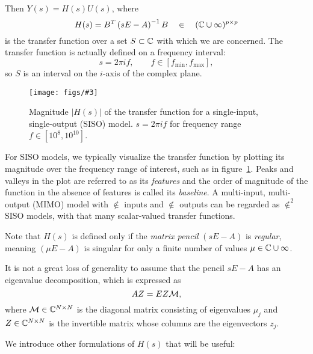 \documentclass[letterpaper]{article}
\newcommand{\putfig}[3][{560 420}]{\texttt{[image: figs/\#3]}} %
\theoremstyle{remark}
\begin{document}
\begin{description}
	Then $Y(s)=H(s)U(s)$, where 
	\begin{equation}
		H(s) = B^T\left(sE-A\right)^{-1}B \quad \in \quad(\mathbb{C}\cup\infty)^{p\times p}
		\label{eq:tfunc}
	\end{equation}
	is the transfer function over a set $S\subset\mathbb{C}$ with which we are concerned.
    The transfer function is actually defined on a frequency interval:
    \begin{equation}
    s = 2\pi i f,\qquad f\in\left[f_\mathrm{min},f_\mathrm{max}\right], 
    \label{eq:tfunc_domain}
    \end{equation}
    so $S$ is an interval on the $i$-axis of the complex plane.  
    
    \begin{figure}[htbp]
		\centering
		\putfig{.48}{ex1b_tfunc.png} 			
		\caption{Magnitude $\vert H(s) \vert$ of the transfer function for a 
		single-input, single-output (SISO) model.  $s=2\pi i f$ for frequency range
		$f\in \left[10^8,10^{10}\right]$.}
		\label{fig:ex1b_tfunc}
	\end{figure}
	\medskip
	
	For SISO models, we typically visualize the transfer function by plotting 
	its magnitude over the frequency range of interest, such as in 
	figure~\ref{fig:ex1b_tfunc}.  Peaks and valleys in the plot are referred to 
	as its \emph{features} and the order of magnitude of the function in the
	absence of features is called its \emph{baseline}.  A multi-input, 
	multi-output (MIMO) model with $\nin$ inputs and $\nin$ outputs can be regarded
	as $\nin^2$ SISO models, with that many scalar-valued transfer functions.
	
	Note that $H(s)$
	is defined only if the \emph{matrix pencil} $(sE-A)$ is \emph{regular}, meaning 
	$(\mu E-A)$ is singular for only a finite number of values $\mu\in\mathbb{C}\cup \infty$. 
	
	
	It is not a great loss of generality to assume that the pencil $sE-A$ has an eigenvalue 
	decomposition, which is expressed as
	\begin{equation}
		AZ = EZ\mathcal{M},
	\label{eq:genEigDecomp}
	\end{equation}
	where $\mathcal{M}\in\mathbb{C}^{N\times N}$ is the diagonal 
	matrix consisting of eigenvalues $\mu_j$ and $Z\in\mathbb{C}^{N\times N}$ is the
	invertible matrix whose columns are the eigenvectors $z_j$.

	We introduce other formulations of $H(s)$ that will be useful: 

\end{description}
\end{document}
